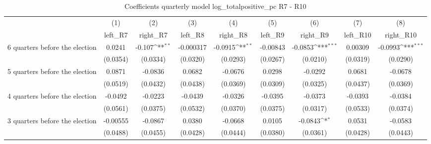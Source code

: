 \begin{table}[htbp]\centering
\def\sym#1{\ifmmode^{#1}\else\(^{#1}\)\fi}
\caption{Coefficients quarterly model log\_totalpositive\_pc R7 - R10}
\begin{tabular}{l*{8}{c}}
\hline\hline
                    &\multicolumn{1}{c}{(1)}&\multicolumn{1}{c}{(2)}&\multicolumn{1}{c}{(3)}&\multicolumn{1}{c}{(4)}&\multicolumn{1}{c}{(5)}&\multicolumn{1}{c}{(6)}&\multicolumn{1}{c}{(7)}&\multicolumn{1}{c}{(8)}\\
                    &\multicolumn{1}{c}{left\_R7}&\multicolumn{1}{c}{right\_R7}&\multicolumn{1}{c}{left\_R8}&\multicolumn{1}{c}{right\_R8}&\multicolumn{1}{c}{left\_R9}&\multicolumn{1}{c}{right\_R9}&\multicolumn{1}{c}{left\_R10}&\multicolumn{1}{c}{right\_R10}\\
\hline
 6 quarters before the election&      0.0241         &      -0.107\sym{**} &   -0.000317         &     -0.0915\sym{**} &    -0.00843         &     -0.0853\sym{***}&     0.00309         &     -0.0993\sym{***}\\
                    &    (0.0354)         &    (0.0334)         &    (0.0320)         &    (0.0293)         &    (0.0267)         &    (0.0210)         &    (0.0319)         &    (0.0290)         \\
[1em]
 5 quarters before the election&      0.0871         &     -0.0836         &      0.0682         &     -0.0676         &      0.0298         &     -0.0292         &      0.0681         &     -0.0678         \\
                    &    (0.0519)         &    (0.0432)         &    (0.0438)         &    (0.0369)         &    (0.0309)         &    (0.0325)         &    (0.0437)         &    (0.0369)         \\
[1em]
 4 quarters before the election&     -0.0492         &     -0.0223         &     -0.0439         &     -0.0326         &     -0.0395         &     -0.0373         &     -0.0393         &     -0.0384         \\
                    &    (0.0561)         &    (0.0375)         &    (0.0532)         &    (0.0370)         &    (0.0375)         &    (0.0317)         &    (0.0533)         &    (0.0374)         \\
[1em]
 3 quarters before the election&    -0.00555         &     -0.0867         &      0.0380         &     -0.0668         &      0.0105         &     -0.0843\sym{*}  &      0.0531         &     -0.0583         \\
                    &    (0.0488)         &    (0.0455)         &    (0.0428)         &    (0.0444)         &    (0.0380)         &    (0.0361)         &    (0.0428)         &    (0.0443)         \\

\end{tabular}
\end{table}
